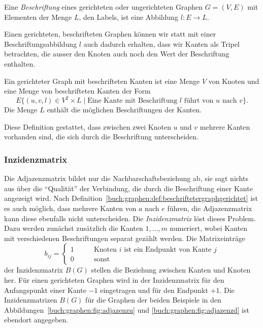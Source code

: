 \begin{definition}
Eine {\em Beschriftung}
eines gerichteten oder ungerichteten Graphen $G=(V,E)$ 
mit Elementen der Menge $L$, den Labels,
ist eine Abbildung $l\colon E\to L$.
%
\end{definition}

Einen gerichteten, beschrifteten Graphen können wir 
statt mit einer Beschriftungsabbildung $l$ auch dadurch erhalten,
dass wir Kanten als Tripel betrachten, die ausser den Knoten auch
noch den Wert der Beschriftung enthalten.

\begin{definition}
\label{buch:graphen:def:beschriftetergraphgerichtet}
Ein gerichteter Graph mit beschrifteten Kanten ist eine Menge $V$ von 
Knoten und eine Menge von beschrifteten Kanten der Form
\[
E \{ (u,v,l)\in V^2\times L \mid \text{Eine Kante mit Beschriftung $l$ führt von $u$ nach $v$}\}.
\]
Die Menge $L$ enthält die möglichen Beschriftungen der Kanten.
\end{definition}

Diese Definition gestattet, dass zwischen zwei Knoten $u$ und $v$
mehrere Kanten vorhanden sind, die sich durch die Beschriftung
unterscheiden.

\subsubsection{Inzidenzmatrix}
Die Adjazenzmatrix bildet nur die Nachbarschaftsbeziehung ab,
sie sagt nichts aus über die ``Qualität'' der Verbindung, die durch
die Beschriftung einer Kante angezeigt wird.
Nach Definition~\ref{buch:graphen:def:beschriftetergraphgerichtet}
ist es auch möglich, dass mehrere Kanten von $a$ nach $e$ führen,
die Adjazenzmatrix kann diese ebenfalls nicht unterscheiden.
Die {\em Inzidenzmatrix}
löst dieses Problem.
%
Dazu werden zunächst zusätzlich die Kanten $1,\dots,m$
numeriert, wobei Kanten mit verschiedenen Beschriftungen separat
gezählt werden.
Die Matrixeinträge
\[
b_{i\!j} = \begin{cases}
1\qquad&\text{Knoten $i$ ist ein Endpunkt von Kante $j$}
\\
0\qquad&\text{sonst}
\end{cases}
\]
der Inzidenzmatrix $B(G)$
stellen die Beziehung zwischen Kanten und Knoten her.
Für einen gerichteten Graphen wird in der Inzidenzmatrix für
den Anfangspunkt einer Kante $-1$ eingetragen und für den
Endpunkt $+1$.
Die Inzidenzmatrizen $B(G)$ für die Graphen der beiden Beispiele
in den Abbildungen~\ref{buch:graphen:fig:adjazenzu} und
\ref{buch:graphen:fig:adjazenzd} ist ebendort angegeben.

